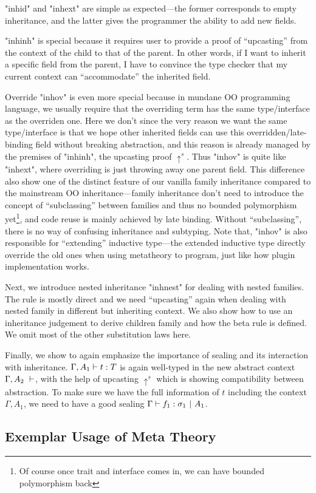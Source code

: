 "inhid" and "inhext" are simple as expected---the former corresponds to
empty inheritance, and the latter gives the programmer the ability to
add new fields.

"inhinh" is special because it requires user to provide a proof of
``upcasting'' from the context of the child to that of the parent.
In other words, if I want to inherit a specific field from the parent, I
have to convince the type checker that my current context can
``accommodate'' the inherited field. 

Override "inhov" is even more special because in mundane OO programming language, we usually require that the overriding term has the same type/interface as the overriden one.  Here we don't since the very reason we want the same type/interface is that we hope other inherited fields can use this overridden/late-binding field without breaking abstraction, and this reason is already managed by the premises of "inhinh", the upcasting proof $\uparrow^s$. Thus "inhov" is quite like "inhext", where overriding is just throwing away one parent field. This difference also show one of the distinct feature of our vanilla family inheritance compared to the mainstream OO inheritance---family inheritance don't need to introduce the concept of ``subclassing'' between families and thus no bounded polymorphism yet\footnote{Of course once trait and interface comes in, we can have bounded polymorphism back}, and code reuse is mainly achieved by late binding. Without ``subclassing'', there is no way of confusing inheritance and subtyping. Note that, "inhov" is also responsible for ``extending'' inductive type---the extended inductive type directly override the old ones when using metatheory to program, just like how plugin implementation works.

Next, we introduce nested inheritance "inhnest" for dealing with nested families. The rule is mostly direct and we need ``upcasting'' again when dealing with nested family in different but inheriting context.  We also show how to use an inheritance judgement to derive children family and how the beta rule is defined. We omit most of the other substitution laws here.

Finally, we show  to again emphasize the importance of sealing and its interaction with inheritance. ${ {\Gamma, A_1} \vdash {t} : {T} }$ is again well-typed in the new abstract context ${ {\Gamma, A_2} \ \vdash }$, with the help of upcasting $\uparrow^s$ which is showing compatibility between abstraction. To make sure we have the full information of $t$ including the context $\Gamma, A_1$, we need to have a good sealing ${ {\Gamma} \vdash {f_1} : {\sigma_1} \ |\ {A_1} }$.



\subsection{Exemplar Usage of Meta Theory}
